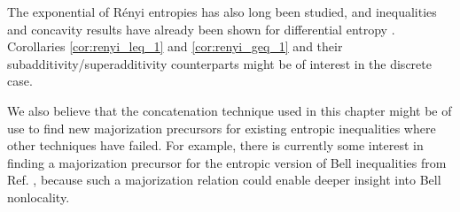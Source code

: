 The exponential of R\'enyi entropies has also long been studied, and inequalities and concavity results have already been shown for differential entropy \cite{rioul_information_2011, guo_generalization_2021}. Corollaries \ref{cor:renyi_leq_1} and \ref{cor:renyi_geq_1} and their subadditivity/superadditivity counterparts might be of interest in the discrete case.

We also believe that the concatenation technique used in this chapter might be of use to find new majorization precursors for existing entropic inequalities where other techniques have failed. For example, there is currently some interest in finding a majorization precursor for the entropic version of Bell inequalities from Ref. \cite{cerf_entropic_1997}, because such a majorization relation could enable deeper insight into Bell nonlocality.